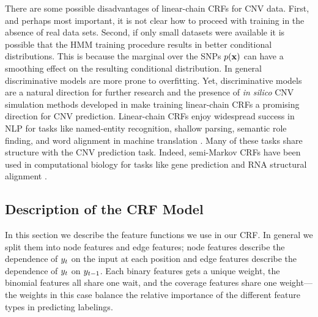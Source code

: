 There are some possible disadvantages of linear-chain CRFs for CNV data. First, and perhaps most important, it is not clear how to proceed with training in the absence of real data sets. Second, if only small datasets were available it is possible that the HMM training procedure results in better conditional distributions. This is because the marginal over the SNPs $p(\mathbf{x})$ can have a smoothing effect on the resulting conditional distribution. In general discriminative models are more prone to overfitting. Yet, discriminative models are a natural direction for further research and the presence of \textit{in silico} CNV simulation methods developed in \citep{rampasek2014fcnv} make training linear-chain CRFs a promising direction for CNV prediction. Linear-chain CRFs enjoy widespread success in NLP for tasks like named-entity recognition, shallow parsing, semantic role finding, and word alignment in machine translation \citep{sutton2012}. Many of these tasks share structure with the CNV prediction task.  Indeed, semi-Markov CRFs have been used in computational biology for tasks like gene prediction \citep{bernal2007} and RNA structural alignment \citep{Sato01012005}.

\subsection{Description of the CRF Model}
In this section we describe the feature functions we use in our CRF. In general we split them into node features and edge features; node features describe the dependence of $y_{t}$ on the input at each position and edge features describe the dependence of $y_{t}$ on $y_{t - 1}$. Each binary features gets a unique weight, the binomial features all share one wait, and the coverage features share one weight---the weights in this case balance the relative importance of the different feature types in predicting labelings.

